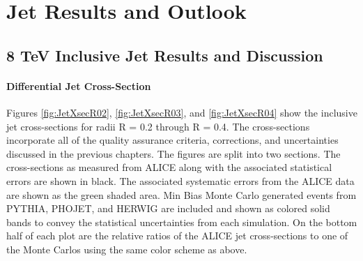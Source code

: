 \chapter{Jet Results and Outlook} \label{ch:cando}

\section{8 TeV Inclusive Jet Results and Discussion}

\subsubsection{Differential Jet Cross-Section}


\noindent
Figures \ref{fig:JetXsecR02}, \ref{fig:JetXsecR03}, and \ref{fig:JetXsecR04} show the inclusive jet cross-sections for radii R = 0.2 through R = 0.4.  The cross-sections incorporate all of the quality assurance criteria, corrections, and uncertainties discussed in the previous chapters.  The figures are split into two sections.  The cross-sections as measured from ALICE along with the associated statistical errors are shown in black.  The associated systematic errors from the ALICE data are shown as the green shaded area.  Min Bias Monte Carlo generated events from PYTHIA, PHOJET, and HERWIG are included and shown as colored solid bands to convey the statistical uncertainties from each simulation.  On the bottom half of each plot are the relative ratios of the ALICE jet cross-sections to one of the Monte Carlos using the same color scheme as above.  

